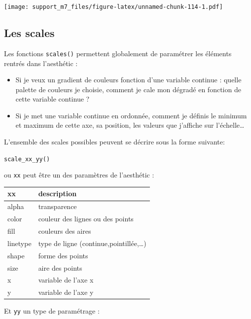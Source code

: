 \documentclass[
]{book}
\begin{document}
\texttt{[image: support\_m7\_files/figure-latex/unnamed-chunk-114-1.pdf]}

\hypertarget{les-scales}{%
\subsection{Les scales}\label{les-scales}}

Les fonctions \texttt{scales()} permettent globalement de paramétrer les éléments rentrés dans l'aesthétic :

\begin{itemize}
\item
  Si je veux un gradient de couleurs fonction d'une variable continue : quelle palette de couleurs je choisie, comment je cale mon dégradé en fonction de cette variable continue ?
\item
  Si je met une variable continue en ordonnée, comment je définis le minimum et maximum de cette axe, sa position, les valeurs que j'affiche sur l'échelle\ldots{}
\end{itemize}

L'ensemble des scales possibles peuvent se décrire sous la forme suivante:

\texttt{scale\_xx\_yy()}

ou \texttt{xx} peut être un des paramètres de l'aesthétic :

\begin{longtable}[]{@{}ll@{}}
\toprule
xx & description \\
\midrule
\endhead
alpha & transparence \\
color & couleur des lignes ou des points \\
fill & couleurs des aires \\
linetype & type de ligne (continue,pointillée,\ldots) \\
shape & forme des points \\
size & aire des points \\
x & variable de l'axe x \\
y & variable de l'axe y \\
\bottomrule
\end{longtable}

Et \texttt{yy} un type de paramétrage :
\end{document}
